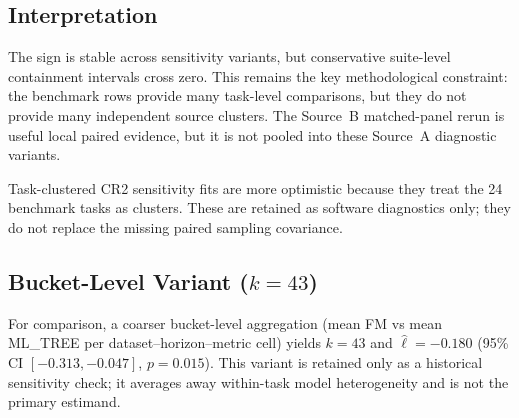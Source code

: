 \subsection{Interpretation}

The sign is stable across sensitivity variants, but conservative
suite-level containment intervals cross zero.  This remains the key
methodological constraint: the benchmark rows provide many task-level
comparisons, but they do not provide many independent source clusters.  The
Source~B matched-panel rerun is useful local paired evidence, but it is not
pooled into these Source~A diagnostic variants.

Task-clustered CR2 sensitivity fits are more optimistic because they treat
the 24 benchmark tasks as clusters.  These are retained as software
diagnostics only; they do not replace the missing paired sampling covariance.

\subsection{\texorpdfstring{Bucket-Level Variant ($k = 43$)}{Bucket-Level Variant (k = 43)}}

For comparison, a coarser bucket-level aggregation
(mean FM vs mean ML\_TREE per dataset--horizon--metric cell) yields
$k = 43$ and $\hat{\ell}=-0.180$ (95\% CI $[-0.313,-0.047]$,
$p=0.015$).  This variant is retained only as a historical sensitivity check;
it averages away within-task model heterogeneity and is not the primary
estimand.
